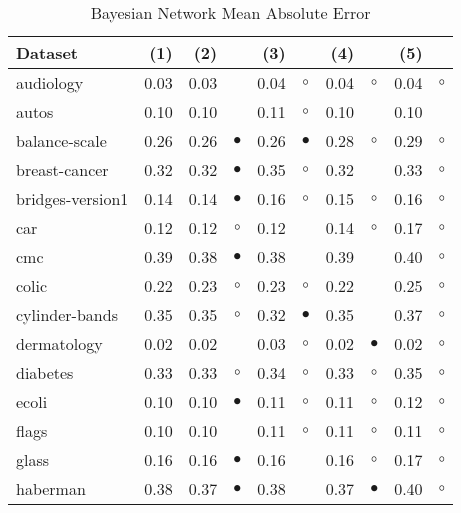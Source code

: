 \begin{table}[thb]
\caption{\label{bnmae}Bayesian Network Mean Absolute Error}
\footnotesize
{\centering \begin{tabular}{lrr@{\hspace{0.1cm}}cr@{\hspace{0.1cm}}cr@{\hspace{0.1cm}}cr@{\hspace{0.1cm}}c}
\\
\hline
Dataset & (1)& (2) & & (3) & & (4) & & (5) & \\
\hline
audiology & 0.03 & 0.03 &            & 0.04 &   $\circ$ & 0.04 &   $\circ$ & 0.04 &   $\circ$\\
autos & 0.10 & 0.10 &            & 0.11 &   $\circ$ & 0.10 &           & 0.10 &          \\
balance-scale & 0.26 & 0.26 &  $\bullet$ & 0.26 & $\bullet$ & 0.28 &   $\circ$ & 0.29 &   $\circ$\\
breast-cancer & 0.32 & 0.32 &  $\bullet$ & 0.35 &   $\circ$ & 0.32 &           & 0.33 &   $\circ$\\
bridges-version1 & 0.14 & 0.14 &  $\bullet$ & 0.16 &   $\circ$ & 0.15 &   $\circ$ & 0.16 &   $\circ$\\
car & 0.12 & 0.12 &    $\circ$ & 0.12 &           & 0.14 &   $\circ$ & 0.17 &   $\circ$\\
cmc & 0.39 & 0.38 &  $\bullet$ & 0.38 &           & 0.39 &           & 0.40 &   $\circ$\\
colic & 0.22 & 0.23 &    $\circ$ & 0.23 &   $\circ$ & 0.22 &           & 0.25 &   $\circ$\\
cylinder-bands & 0.35 & 0.35 &    $\circ$ & 0.32 & $\bullet$ & 0.35 &           & 0.37 &   $\circ$\\
dermatology & 0.02 & 0.02 &            & 0.03 &   $\circ$ & 0.02 & $\bullet$ & 0.02 &   $\circ$\\
diabetes & 0.33 & 0.33 &    $\circ$ & 0.34 &   $\circ$ & 0.33 &   $\circ$ & 0.35 &   $\circ$\\
ecoli & 0.10 & 0.10 &  $\bullet$ & 0.11 &   $\circ$ & 0.11 &   $\circ$ & 0.12 &   $\circ$\\
flags & 0.10 & 0.10 &            & 0.11 &   $\circ$ & 0.11 &   $\circ$ & 0.11 &   $\circ$\\
glass & 0.16 & 0.16 &  $\bullet$ & 0.16 &           & 0.16 &   $\circ$ & 0.17 &   $\circ$\\
haberman & 0.38 & 0.37 &  $\bullet$ & 0.38 &           & 0.37 & $\bullet$ & 0.40 &   $\circ$\\

\end{tabular}}
\end{table}

